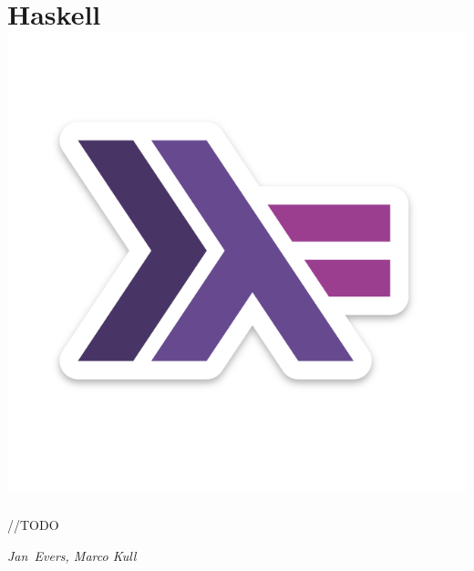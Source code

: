 \section*{Haskell\hfill\includegraphics[width=.35\linewidth]{images/haskell-logo.png}}
//TODO

\hfill\textit{Jan~Evers, Marco Kull}